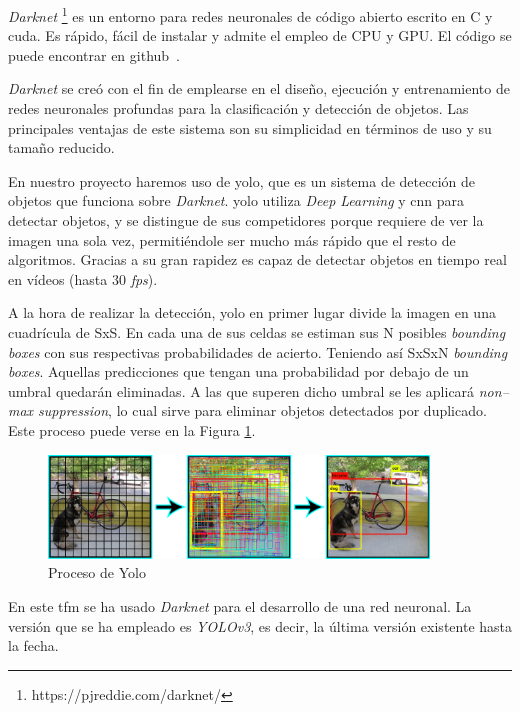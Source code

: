 \textit{Darknet} \footnote{https://pjreddie.com/darknet/} es un entorno para redes neuronales de código abierto escrito en C y \acrshort{cuda}. Es rápido, fácil de instalar y admite el empleo de CPU y GPU. El código se puede encontrar en github~\cite{darknet_github}.

\textit{Darknet} se creó con el fin de emplearse en el diseño, ejecución y entrenamiento de redes neuronales profundas para la clasificación y detección de objetos. Las principales ventajas de este sistema son su simplicidad en términos de uso y su tama\~{n}o reducido.

En nuestro proyecto haremos uso de \acrfull{yolo}, que es un sistema de detección de objetos que funciona sobre \textit{Darknet}. \acrshort{yolo} utiliza \textit{Deep Learning} y \acrshort{cnn} para detectar objetos, y se distingue de sus competidores porque requiere de ver la imagen una sola vez, permitiéndole ser mucho más rápido que el resto de algoritmos. Gracias a su gran rapidez es capaz de detectar objetos en tiempo real en vídeos (hasta 30 \textit{\acrshort{fps}}).

A la hora de realizar la detección, \acrshort{yolo} en primer lugar divide la imagen en una cuadrícula de SxS. En cada una de sus celdas se estiman sus N posibles \textit{bounding boxes} con sus respectivas probabilidades de acierto. Teniendo así SxSxN \textit{bounding boxes}. Aquellas predicciones que tengan una probabilidad por debajo de un umbral quedarán eliminadas. A las que superen dicho umbral se les aplicará \textit{non--max suppression}, lo cual sirve para eliminar objetos detectados por duplicado. Este proceso puede verse en la  Figura \ref{fig.yolo}.

\begin{figure}[H]
  \begin{center}
    \includegraphics[width=0.9\textwidth]{figures/Herramientas/yolo.png}
		\caption{Proceso de Yolo}
		\label{fig.yolo}
		\end{center}
\end{figure}

En este \acrshort{tfm} se ha usado \textit{Darknet} para el desarrollo de una red neuronal. La versión que se ha empleado es \textit{YOLOv3}, es decir, la última versión existente hasta la fecha.


